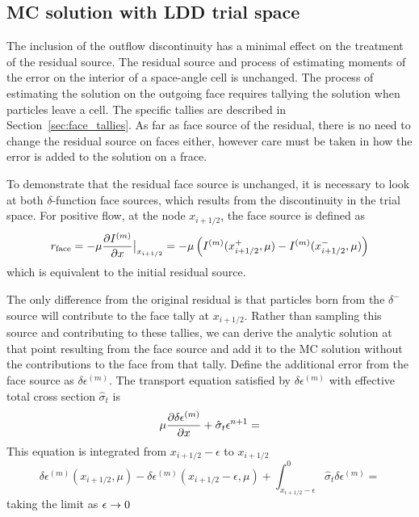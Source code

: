 \newcommand{\dep}{\ensuremath{\delta\epsilon^{(m)}}}

\subsection{MC solution with LDD trial space}
\label{sec:ldd_mc}

The inclusion of the outflow discontinuity has a minimal effect on the treatment of the
residual source. The residual source and process of estimating moments of
the error on the interior of a space-angle cell is unchanged.  The process of estimating
the solution on the outgoing face requires tallying the solution when particles leave a
cell. The specific
tallies are described in Section~\ref{sec:face_tallies}.  As far as face source of the
residual, there is no need to change the residual source on faces either, however care
must be taken in how the error is added to the solution on a frace.  

To demonstrate that the residual face source is unchanged, it is necessary to look at both 
$\delta$-function face sources, which results from the discontinuity in the trial space.  For
positive flow, at the node $x_{i+1/2}$, the face source is defined as
\begin{equation}
    \label{eq:res_face}
    r_{\text{face}} = -\mu \frac{\partial I^{(m)}}{\partial x}\big|_{x_{i+1/2}} =-\mu\left( I^{(m)}(x_{i+1/2}^+,\mu) -I^{(m)}(x_{i+1/2}^-,\mu) \right)
\end{equation}
which is equivalent to the initial residual source. 

The only difference from the original residual
is that particles born from the $\delta^-$ source will contribute to the face tally at $x_{i+1/2}$.  
Rather than sampling this source and contributing to these tallies, we can derive
the analytic solution at that point resulting from the face source and add it to the MC
solution without the contributions to the face from that tally.  Define the additional error
from the face source as $\delta \epsilon^{(m)}$.  The transport equation satisfied by $\delta
\epsilon^{(m)}$ with effective total cross 
section $\hat \sigma_t$ is
\begin{equation}
    \label{eq:ho_face}
    \mu \frac{\partial \delta\epsilon^{(m)}}{\partial x} + \hat\sigma_t \epsilon^{n+1} = 
\end{equation}
This equation is integrated from $x_{i+1/2}-\epsilon$ to $x_{i+1/2}$
\begin{equation}
    \dep(x_{i+1/2},\mu) - \dep(x_{i+1/2}-\epsilon,\mu)  + \int_{x_{i+1/2}-\epsilon}^0 
      \hat \sigma_t \dep = 
\end{equation}
taking the limit as $\epsilon\rightarrow 0$






